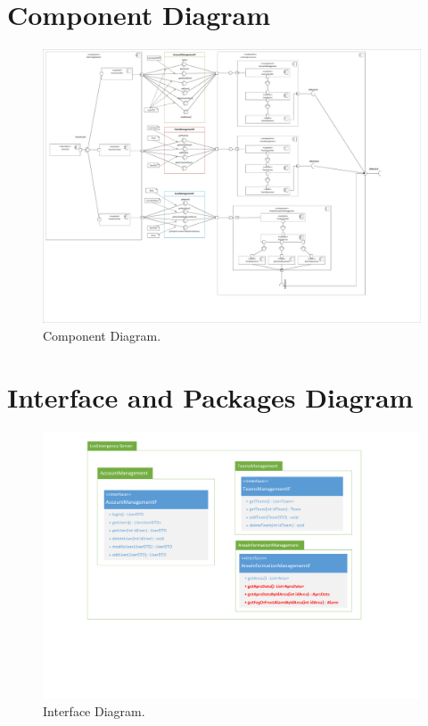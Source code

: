 \section{Component Diagram}

\begin{figure}[h!]
	\centering
	\includegraphics[width=1\linewidth]{./Iterazione 3/OtherFiles/UML - Component view}
	\caption{Component Diagram.}
	\label{fig:ComponentDiagram_iterazione3}
\end{figure}

\clearpage

\section{Interface and Packages Diagram}

\begin{figure}[h!]
	\centering
	\includegraphics[width=0.8\linewidth]{./Iterazione 3/OtherFiles/UML - Interface Diagram}
	\caption{Interface Diagram.}
\label{fig:InterfaceDiagram_iterazione3}
\end{figure}